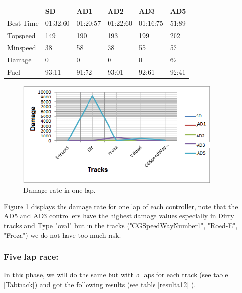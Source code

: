 \documentclass{llncs}
\begin{document}
\begin{table} [h!]
	\begin{tabular}{ |p{3cm}|p{2cm}|p{2cm}|p{2 cm}|p{2 cm}|p{2 cm}|}
		\hline
		&
		{ \color{red}\textbf{SD}}&  
		{ \color{red} \textbf{AD1} } &
		{ \color{red} \textbf{AD2} } &
		{ \color{red} \textbf{AD3} } &
		{ \color{red} \textbf{AD5} }
		\\
		\hline
		Best Time & 01:32:60   & 01:20:57 & 01:22:60 & 01:16:75 & 51:89 
		\\
		\hline
		Topspeed & 149  & 190 & 193 & 199 & 202
		\\
		\hline
		Minspeed & 38 & 58 & 38 & 55  & 53
		\\
		\hline 
		Damage & 0 & 0 & 0& 0 & 62
		\\
		\hline 
		Fuel & 93:11  & 91:72 & 93:01 & 92:61 & 92:41
		\\
		\hline 
		
	\end{tabular} 
\end{table}
\newpage

\begin{figure}[h!]
	
	\centering
	\includegraphics[width=0.9\textwidth]{fig/choc1lap.PNG}
	\begin{minipage}{10cm}
		\centering
		\caption{\footnotesize Damage rate in one lap.}
		\label{choclap}
	\end{minipage} 
\end{figure}


Figure \ref{choclap} displays the damage rate for one lap of each controller, note that the AD5 and AD3 controllers  have the highest damage values especially in Dirty tracks and Type "oval" but in the tracks ("CGSpeedWayNumber1", "Roed-E", "Froza") we do not have too much risk.

\newpage


\subsubsection{ Five lap race:}	
In this phase, we will do the same but with 5 laps for each track (see table \ref {Tabtrack}) and got the following results (see table \ref{resulta12} ). \\
\end{document}
